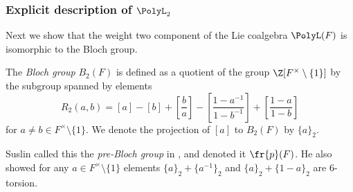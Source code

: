 \documentclass[a4paper]{amsart}
\begin{document}
\subsubsection{Explicit description of  $\PolyL_2$} Next we show that the weight two component of the Lie coalgebra $\PolyL(F)$ is isomorphic to the Bloch group. 

\begin{definition}The \emph{Bloch group} $B_2(F)$ is defined as a quotient of the group $\Z[F^{\times}\setminus \{1\}]$ by the subgroup spanned by elements 
\begin{equation}\label{Equation5term}
R_2(a,b)=[a]-[b]+\left [ \frac{b}{a}\right ] - \left [ \frac{1-a^{-1}}{1-b^{-1}}\right ] + \left [ \frac{1-a}{1-b}\right ]
\end{equation}
for $a\neq b \in F^{\times}\setminus \{1\}$. We denote the projection of $[a]$ to $B_2(F)$ by $\{a\}_2$.\end{definition}

\begin{remark}Suslin called this the \emph{pre-Bloch group} in  \cite{Sus90}, and denoted it $\fr{p}(F)$. He also showed for any $a\in F^{\times}\setminus \{1\}$ elements $\{a\}_2+\{a^{-1}\}_2$ and $\{a\}_2+\{1-a\}_2$ are $6$-torsion.\end{remark}
\end{document}
